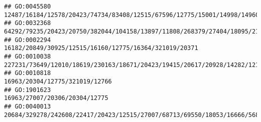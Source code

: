 \documentclass[
]{article}
\begin{document}
\begin{verbatim}
## GO:0045580                                                                                                                                                                                                                                                                                                                    12487/16184/12578/20423/74734/83408/12515/67596/12775/15001/14998/14960/16149/20371/16186
## GO:0032368                                                                                                                                                                                                                                                                                                                             64292/79235/20423/20750/382044/104158/13897/11808/268379/27404/18095/21943/14419
## GO:0002294                                                                                                                                                                                                                                                                                                                                                       16182/20849/30925/12515/16160/12775/16364/321019/20371
## GO:0010038                                                                                                                                                                                                                                                                227231/73649/12010/18619/230163/18671/20423/19415/20617/20928/14282/12176/17752/17751/81897/432530/20500/18164/20701/20704/192113/12475/12780
## GO:0010818                                                                                                                                                                                                                                                                                                                                                                               16963/20304/12775/321019/12766
## GO:1901623                                                                                                                                                                                                                                                                                                                                                                                16963/27007/20306/20304/12775
## GO:0040013                                                                                                                                                                                                                                                                     20684/329278/242608/22417/20423/12515/27007/68713/69550/18053/16666/56838/13134/110168/57277/106014/11815/19876/11629/13078/16149/170942

\end{verbatim}
\end{document}
